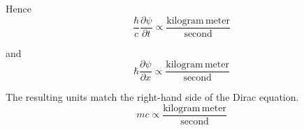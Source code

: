 \documentclass[12pt]{article}
\begin{document}
\noindent
Hence
\begin{equation*}
\frac{\hbar}{c}\frac{\partial\psi}{\partial t}
\propto\frac{\text{kilogram}\,\text{meter}}{\text{second}}
\end{equation*}

\noindent
and
\begin{equation*}
\hbar\frac{\partial\psi}{\partial x}\propto\frac{\text{kilogram}\,\text{meter}}{\text{second}}
\end{equation*}

\noindent
The resulting units match the right-hand side of the Dirac equation.
\begin{equation*}
mc\propto\frac{\text{kilogram}\,\text{meter}}{\text{second}}
\end{equation*}
\end{document}
